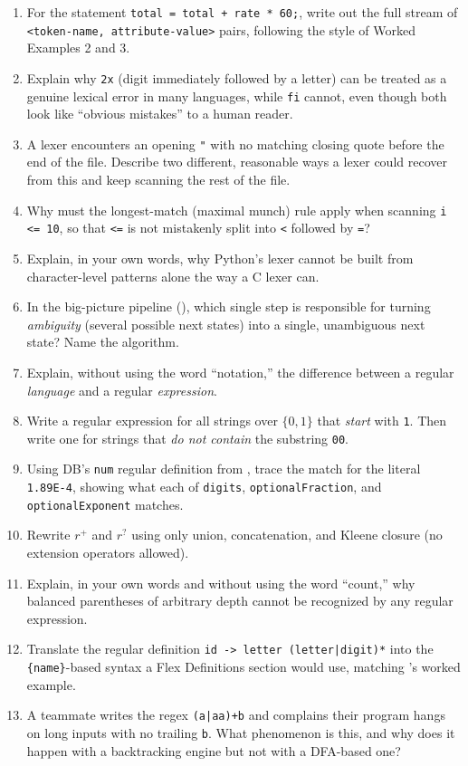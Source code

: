 \documentclass[full-course-notes.tex]{subfiles}
\begin{document}
\begin{enrichment}
\begin{enumerate}
  \item For the statement \texttt{total = total + rate * 60;}, write out the full stream of
  \texttt{<token-name, attribute-value>} pairs, following the style of Worked Examples 2 and 3.
  \item Explain why \texttt{2x} (digit immediately followed by a letter) can be treated as a
  genuine lexical error in many languages, while \texttt{fi} cannot, even though both look like
  ``obvious mistakes'' to a human reader.
  \item A lexer encounters an opening \texttt{"} with no matching closing quote before the end
  of the file. Describe two different, reasonable ways a lexer could recover from this and keep
  scanning the rest of the file.
  \item Why must the longest-match (maximal munch) rule apply when scanning \texttt{i <= 10}, so
  that \texttt{<=} is not mistakenly split into \texttt{<} followed by \texttt{=}?
  \item Explain, in your own words, why Python's lexer cannot be built from character-level
  patterns alone the way a C lexer can.
  \item In the big-picture pipeline (), which single step is
  responsible for turning \emph{ambiguity} (several possible next states) into a single,
  unambiguous next state? Name the algorithm.
  \item Explain, without using the word ``notation,'' the difference between a regular
  \emph{language} and a regular \emph{expression}.
  \item Write a regular expression for all strings over $\{0,1\}$ that \emph{start} with
  \texttt{1}. Then write one for strings that \emph{do not contain} the substring \texttt{00}.
  \item Using DB's \texttt{num} regular definition from ,
  trace the match for the literal \texttt{1.89E-4}, showing what each of \texttt{digits},
  \texttt{optionalFraction}, and \texttt{optionalExponent} matches.
  \item Rewrite $r^{+}$ and $r^{?}$ using only union, concatenation, and Kleene closure (no
  extension operators allowed).
  \item Explain, in your own words and without using the word ``count,'' why balanced
  parentheses of arbitrary depth cannot be recognized by any regular expression.
  \item Translate the regular definition \texttt{id -> letter (letter|digit)*} into the
  \texttt{\{name\}}-based syntax a Flex Definitions section would use, matching
  's worked example.
  \item A teammate writes the regex \texttt{(a|aa)+b} and complains their program hangs on long
  inputs with no trailing \texttt{b}. What phenomenon is this, and why does it happen with a
  backtracking engine but not with a DFA-based one?
\end{enumerate}
\end{enrichment}
\end{document}
